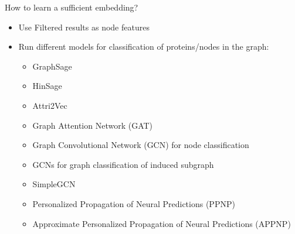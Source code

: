 \documentclass[10pt]{beamer}
\begin{document}
\begin{frame}{How to learn a sufficient embedding?}
	\begin{itemize}
		\item Use Filtered results as node features
		\item Run different models for classification of proteins/nodes in the graph:
		\begin{itemize}
			\item GraphSage
			\item HinSage
			\item Attri2Vec
			\item Graph Attention Network (GAT)
			\item Graph Convolutional Network (GCN) for node classification
			\item GCNs for graph classification of induced subgraph
			\item SimpleGCN
			\item Personalized Propagation of Neural Predictions (PPNP)
			\item Approximate Personalized Propagation of Neural Predictions (APPNP)
		\end{itemize}
	\end{itemize}
	
\end{frame}
\end{document}
